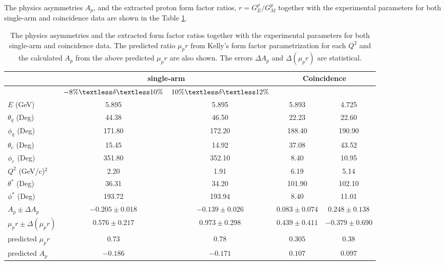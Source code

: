 \documentclass[12pt]{article}
\begin{document}
The physics asymmetries $A_p$, and the extracted proton form factor ratios, $r=G_E^p/G_M^p$ together with the experimental parameters for both single-arm and coincidence data are shown in the Table \ref{tabasym}.
 \begin{table}[htbp]
   \centering
   \begin{tabular}{|l|c|c|c|c|} 
      \hline
         & \multicolumn{2}{c|}{single-arm} & \multicolumn{2}{c|}{Coincidence} \\
      \hline
         & $-8\% \textless \delta \textless 10\%$ & $10\% \textless \delta \textless 12\%$ & \multicolumn{2}{c|}{} \\
      \hline
      $E$            (GeV)                   & 5.895        & 5.895       &  5.893     &     4.725   \\
      $\theta_q$ (Deg)            &   44.38      &   46.50     &   22.23     &    22.60   \\
      $\phi_q$    (Deg)              & 171.80      & 172.20     & 188.40    &  190.90   \\      
      $\theta_e$ (Deg)            &   15.45      &   14.92     &    37.08    &     43.52  \\      
      $\phi_e$    (Deg)               & 351.80      & 352.10     &       8.40   &     10.95  \\
      $Q^2$ (GeV/c)$^2$           &      2.20      &      1.91    &       6.19   &        5.14  \\
      $\theta^*$ (Deg)            &     36.31    &    34.20    &  101.90   &     102.10 \\
      $\phi^*$ (Deg)                &   193.72    &  193.94    &       8.40   &       11.01 \\
      $A_p\pm \Delta A_p$         & $-0.205 \pm 0.018$ & $-0.139 \pm 0.026$ & $0.083 \pm 0.074$ & $0.248 \pm 0.138$\\
      $\mu_p r \pm \Delta (\mu_p r)$  & $0.576 \pm 0.217$  & $0.973 \pm 0.298$  & $0.439 \pm 0.411$   &  $-0.379\pm 0.690$\\
      \hline
      predicted $\mu_p r$               & $0.73$     & $0.78$      & $0.305$   &  $0.38$ \\
      predicted $A_p$                 & $-0.186$ & $-0.171$  & $0.107$   &  $0.097$\\
      \hline    
      \end{tabular}
   \caption{ The physics asymmetries and the extracted form factor ratios together with the experimental parameters  for both single-arm and coincidence data. The predicted ratio $\mu_p r$ from Kelly's form factor parametrization \cite{99} for each $Q^2$ and the calculated $A_p$ from the above predicted $\mu_p r$ are also shown. The errors $\Delta A_p$ and $\Delta(\mu_p r)$ are statistical.}
   \label{tabasym}
   \end{table}
\end{document}
